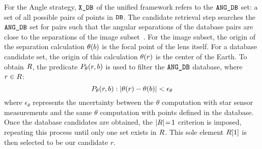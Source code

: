 For the Angle strategy, $\texttt{X\_DB}$ of the unified framework refers to the $\texttt{ANG\_DB}$ set: a set of all possible pairs of points in $\texttt{DB}$.
The candidate retrieval step searches the $\texttt{ANG\_DB}$ set for pairs such that the angular separations of the database pairs are close to the separations of the image subset~\cite{bratt:analysisStarIdentification}.
For the image subset, the origin of the separation calculation $\theta(b)$ is the focal point of the lens itself.
For a database candidate set, the origin of this calculation $\theta(r)$ is the center of the Earth.
To obtain $R$, the predicate $P_\theta(r, b)$ is used to filter the $\texttt{ANG\_DB}$ database, where $r \in R$:
\begin{equation}\label{eq:angleRequirement}
    P_{\theta}(\candidateset, \imagesubset) : \left\lvert \theta(\candidateset) - \theta(\imagesubset)\right\rvert < \epsilon_\theta
\end{equation}
where $\epsilon_{\theta}$ represents the uncertainty between the $\theta$ computation with star
sensor measurements and the same $\theta$ computation with points defined in the database.
Once the database candidates are obtained, the $\left| R \right| \!=\! 1$ criterion is imposed, repeating this process until only one set exists in $R$.
This sole element $R[1]$ is then selected to be our candidate $r$.

